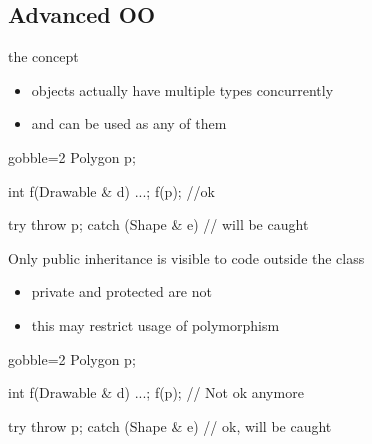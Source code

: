 \subsection[OO]{Advanced OO}

\begin{frame}[fragile]
  \begin{block}{the concept}
    \begin{itemize}
    \item objects actually have multiple types concurrently
    \item and can be used as any of them
    \end{itemize}
  \end{block}
  \begin{multicols}{2}
    \begin{cppcode*}{gobble=2}
      Polygon p;

      int f(Drawable & d) {...};
      f(p);  //ok

      try {
        throw p;
      } catch (Shape & e) {
        // will be caught
      }
    \end{cppcode*}
    \columnbreak
    \center
  \end{multicols}
\end{frame}


\begin{frame}[fragile]
  \begin{block}{Only public inheritance is visible to code outside the class}
    \begin{itemize}
    \item private and protected are not
    \item this may restrict usage of polymorphism
    \end{itemize}
  \end{block}
  \begin{multicols}{2}
    \begin{cppcode*}{gobble=2}
      Polygon p;

      int f(Drawable & d) {...};
      f(p);  // Not ok anymore

      try {
        throw p;
      } catch (Shape & e) {
        // ok, will be caught
      }
    \end{cppcode*}
    \columnbreak
    \center
  \end{multicols}
\end{frame}

